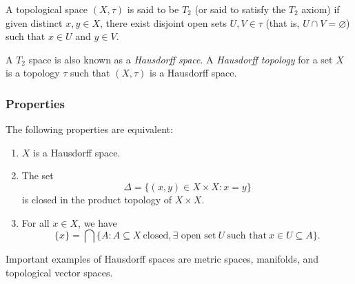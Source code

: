 \documentclass[12pt]{article}
\def\emptyset{\varnothing}
\begin{document}
A topological space $(X,\tau)$ is said to be $T_2$ 
(or said to satisfy the $T_2$ axiom) if given 
distinct $x,y\in X$, there exist disjoint 
open sets $U,V\in\tau$ (that is, $U\cap V=\emptyset$) 
such that $x\in U$ and $y\in V$.

A $T_2$ space is also known as a \emph{Hausdorff space}.
A \emph{Hausdorff topology} for a set $X$ is a topology 
$\tau$ such that $(X,\tau)$ is a Hausdorff space.

\subsubsection*{Properties}
The following properties are equivalent:
\begin{enumerate}
\item $X$ is a Hausdorff space. 
\item The set 
$$
\Delta=\{(x,y)\in X\times X:x=y\}
$$
is closed in the product topology of $X\times X$.
\item For all $x\in X$, we have
$$
  \{x\} = \bigcap \{A : A\subseteq X\ \mbox{closed}, \mbox{$\exists$ open set}\  U\ \mbox{such that}\ x\in U\subseteq A\}.
$$
\end{enumerate}

Important examples of Hausdorff spaces are metric spaces, manifolds, 
and topological vector spaces.
\end{document}
